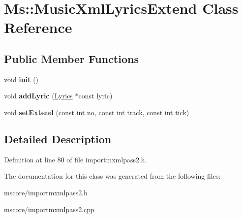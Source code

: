 \hypertarget{class_ms_1_1_music_xml_lyrics_extend}{}\section{Ms\+:\+:Music\+Xml\+Lyrics\+Extend Class Reference}
\label{class_ms_1_1_music_xml_lyrics_extend}
\subsection*{Public Member Functions}
\begin{DoxyCompactItemize}
\item 
\mbox{\label{class_ms_1_1_music_xml_lyrics_extend_afd81de7b8145bd0dfeb8ebe447f605e2}} 
void {\bfseries init} ()
\item 
\mbox{\label{class_ms_1_1_music_xml_lyrics_extend_a1236fbaf987338484e6d017fbef05632}} 
void {\bfseries add\+Lyric} (\hyperlink{class_ms_1_1_lyrics}{Lyrics} $\ast$const lyric)
\item 
\mbox{\label{class_ms_1_1_music_xml_lyrics_extend_ac76268931e3e9b5f3ff46c464059139b}} 
void {\bfseries set\+Extend} (const int no, const int track, const int tick)
\end{DoxyCompactItemize}


\subsection{Detailed Description}


Definition at line 80 of file importmxmlpass2.\+h.



The documentation for this class was generated from the following files\+:\begin{DoxyCompactItemize}
\item 
mscore/importmxmlpass2.\+h\item 
mscore/importmxmlpass2.\+cpp\end{DoxyCompactItemize}
